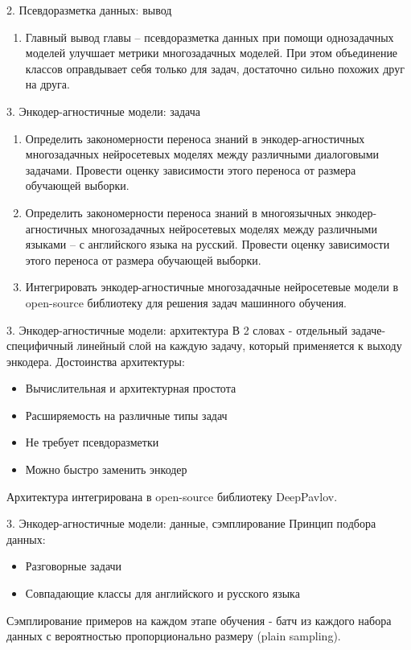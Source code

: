\begin{frame}{2. Псевдоразметка данных: вывод}
\begin{enumerate}

\item Главный вывод главы -- псевдоразметка данных при помощи однозадачных моделей улучшает метрики многозадачных моделей. При этом объединение классов оправдывает себя только для задач, достаточно сильно похожих друг на друга. 
\end{enumerate}
\end{frame}

\begin{frame}{3. Энкодер-агностичные модели: задача}
\begin{enumerate}
    \item {Определить закономерности переноса знаний в энкодер-агностичных многозадачных нейросетевых моделях между различными диалоговыми задачами. Провести оценку зависимости этого переноса от размера обучающей выборки.}
    \item {Определить закономерности переноса знаний в многоязычных энкодер-агностичных многозадачных нейросетевых моделях между различными языками -- с английского языка на русский. Провести оценку зависимости этого переноса от размера обучающей выборки.}
    \item {Интегрировать энкодер-агностичные многозадачные нейросетевые модели в open-source библиотеку для решения задач машинного обучения.} 
 \end{enumerate}
\end{frame}

\begin{frame}{3. Энкодер-агностичные модели: архитектура}
В 2 словах - отдельный задаче-специфичный линейный слой на каждую задачу, который применяется к выходу энкодера.
Достоинства архитектуры:
\begin{itemize}
  \item Вычислительная и архитектурная простота
  \item Расширяемость на различные типы задач
  \item Не требует псевдоразметки
  \item Можно быстро заменить энкодер
\end{itemize}
Архитектура интегрирована в open-source библиотеку DeepPavlov.
\end{frame}

\begin{frame}{3. Энкодер-агностичные модели: данные, сэмплирование}
Принцип подбора данных:
\begin{itemize}
    \item Разговорные задачи
    \item Совпадающие классы для английского и русского языка
\end{itemize}
Сэмплирование примеров на каждом этапе обучения - батч из каждого набора данных с вероятностью пропорционально размеру (plain sampling).
\end{frame}

